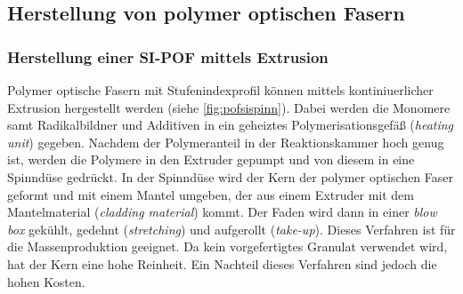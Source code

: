 \subsection{Herstellung von polymer optischen Fasern}
\label{subsec:pofherstellungsverfahren}

\subsubsection{Herstellung einer SI-POF mittels Extrusion}

Polymer optische Fasern mit Stufenindexprofil können mittels kontiniuerlicher
Extrusion hergestellt werden (siehe \autoref{fig:pofsispinn}). Dabei werden die
Monomere samt Radikalbildner und Additiven in ein geheiztes Polymerisationsgefäß
(\textit{heating unit}) gegeben. Nachdem der Polymeranteil in der
Reaktionskammer hoch genug ist, werden die Polymere in den Extruder gepumpt und
von diesem in eine Spinndüse gedrückt. In der Spinndüse wird der Kern der
polymer optischen Faser geformt und mit einem Mantel umgeben, der aus einem
Extruder mit dem Mantelmaterial (\textit{cladding material}) kommt. Der Faden
wird dann in einer \textit{blow box} gekühlt, gedehnt (\textit{stretching}) und
aufgerollt (\textit{take-up}). Dieses Verfahren ist für die Massenproduktion
geeignet. Da kein vorgefertigtes Granulat verwendet wird, hat der Kern eine hohe
Reinheit. Ein Nachteil dieses Verfahren sind jedoch die hohen Kosten.

